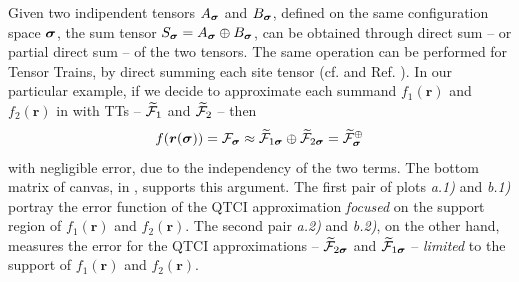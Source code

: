 Given two indipendent tensors $A_{\boldsymbol{\sigma}}$ and 
$B_{\boldsymbol{\sigma}}$, defined on the same configuration space $\boldsymbol{\sigma}$, the sum tensor $S_{\boldsymbol{\sigma}} = A_{\boldsymbol{\sigma}} \oplus B_{\boldsymbol{\sigma}}$, can be obtained through direct sum -- or partial direct sum -- of the two tensors. The same operation can be performed for Tensor Trains, by direct summing each site tensor (cf.  and Ref. \cite{Lee2018}). 
In our particular example, if we decide to approximate each summand $f_1(\boldsymbol{r})$ and $f_2(\boldsymbol{r})$ in  with TTs -- $\widetilde{\mathcal{F}}_1$ and $\widetilde{\mathcal{F}}_2$ -- then 
\begin{equation}
	f(\boldsymbol{r}(\boldsymbol{\sigma})) = \mathcal{F}_{\boldsymbol{\sigma}} \approx \widetilde{\mathcal{F}}_{1\boldsymbol{\sigma}} \oplus \widetilde{\mathcal{F}}_{2\boldsymbol{\sigma}} = \widetilde{\mathcal{F}}^\oplus_{\boldsymbol{\sigma}}
	\label{eq:localTermsSum}
\end{equation}
with negligible error, due to the independency of the two terms. The bottom matrix of canvas, in , supports this argument. The first pair of plots \textit{a.1)} and \textit{b.1)} portray the error function of the QTCI approximation \textit{focused} on the support region of $f_1(\boldsymbol{r})$ and $f_2(\boldsymbol{r})$. The second pair \textit{a.2)} and \textit{b.2)}, on the other hand, measures the error for the QTCI approximations -- $\widetilde{\mathcal{F}}_{2\boldsymbol{\sigma}}$ and $\widetilde{\mathcal{F}}_{1\boldsymbol{\sigma}}$ -- \textit{limited} \footnotemark to the support of $f_1(\boldsymbol{r})$ and $f_2(\boldsymbol{r})$.

